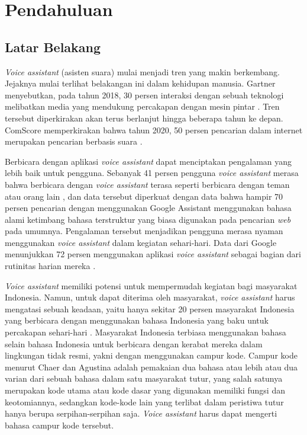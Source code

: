 \chapter{Pendahuluan}

\section{Latar Belakang}

\textit{Voice assistant} (asisten suara) mulai menjadi tren yang makin berkembang. Jejaknya mulai terlihat belakangan ini dalam kehidupan manusia. Gartner menyebutkan, pada tahun 2018, 30 persen interaksi dengan sebuah teknologi melibatkan media yang mendukung percakapan dengan mesin pintar \parencite{escherich2015market}. Tren tersebut diperkirakan akan terus berlanjut hingga beberapa tahun ke depan. ComScore memperkirakan bahwa tahun 2020, 50 persen pencarian dalam internet merupakan pencarian berbasis suara \parencite{olson2016just}.

Berbicara dengan aplikasi \textit{voice assistant} dapat menciptakan pengalaman yang lebih baik untuk pengguna. Sebanyak 41 persen pengguna \textit{voice assistant} merasa bahwa berbicara dengan \textit{voice assistant} terasa seperti berbicara dengan teman atau orang lain \parencite{kleinberg2018five}, dan data tersebut diperkuat dengan data bahwa hampir 70 persen pencarian dengan menggunakan Google Assistant menggunakan bahasa alami ketimbang bahasa terstruktur yang biasa digunakan pada pencarian \textit{web} pada umumnya. Pengalaman tersebut menjadikan pengguna merasa nyaman menggunakan \textit{voice assistant} dalam kegiatan sehari-hari. Data dari Google menunjukkan 72 persen menggunakan aplikasi \textit{voice assistant} sebagai bagian dari rutinitas harian mereka \parencite{kleinberg2018five}.

\textit{Voice assistant} memiliki potensi untuk mempermudah kegiatan bagi masyarakat Indonesia. Namun, untuk dapat diterima oleh masyarakat, \textit{voice assistant} harus mengatasi sebuah keadaan, yaitu hanya sekitar 20 persen masyarakat Indonesia yang berbicara dengan menggunakan bahasa Indonesia yang baku untuk percakapan sehari-hari \parencite{naim2012kewarganegaraan}. Masyarakat Indonesia terbiasa menggunakan bahasa selain bahasa Indonesia untuk berbicara dengan kerabat mereka dalam lingkungan tidak resmi, yakni dengan menggunakan campur kode. Campur kode menurut Chaer dan Agustina \parencite{chaer1995sosiolinguistik} adalah pemakaian dua bahasa atau lebih atau dua varian dari sebuah bahasa dalam satu masyarakat tutur, yang salah satunya merupakan kode utama atau kode dasar yang digunakan memiliki fungsi dan keotomiannya, sedangkan kode-kode lain yang terlibat dalam peristiwa tutur hanya berupa serpihan-serpihan saja. \textit{Voice assistant} harus dapat mengerti bahasa campur kode tersebut.

